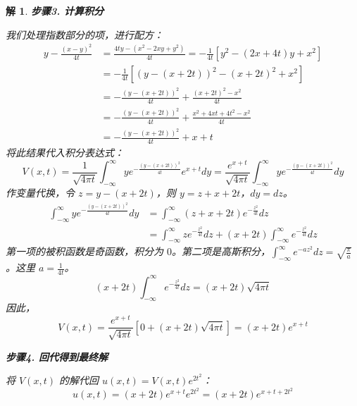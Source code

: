 \documentclass[12pt,a4paper]{article}
\newtheorem*{solution}{解}
\begin{document}
\begin{solution}
		\hrulefill
		
		\textbf{步骤3. 计算积分}
		
		\noindent
		我们处理指数部分的项，进行配方：
		\begin{align*}
			y - \frac{(x-y)^2}{4t} &= \frac{4ty - (x^2 - 2xy + y^2)}{4t} = -\frac{1}{4t} [y^2 - (2x+4t)y + x^2] \\[6pt]
			&= -\frac{1}{4t} \left[ \left(y - (x+2t)\right)^2 - (x+2t)^2 + x^2 \right] \\
			&= -\frac{(y - (x+2t))^2}{4t} + \frac{(x+2t)^2 - x^2}{4t} \\[6pt]
			&= -\frac{(y - (x+2t))^2}{4t} + \frac{x^2 + 4xt + 4t^2 - x^2}{4t} \\
			&= -\frac{(y - (x+2t))^2}{4t} + x + t
		\end{align*}
		将此结果代入积分表达式：
		\[
		V(x,t) = \frac{1}{\sqrt{4\pi t}} \int_{-\infty}^{\infty} y e^{-\frac{(y - (x+2t))^2}{4t}} e^{x+t} dy = \frac{e^{x+t}}{\sqrt{4\pi t}} \int_{-\infty}^{\infty} y e^{-\frac{(y - (x+2t))^2}{4t}} dy
		\]
		作变量代换，令 $z = y - (x+2t)$，则 $y = z + x + 2t$，$dy = dz$。
		\begin{align*}
			\int_{-\infty}^{\infty} y e^{-\frac{(y - (x+2t))^2}{4t}} dy &= \int_{-\infty}^{\infty} (z + x + 2t) e^{-\frac{z^2}{4t}} dz \\[6pt]
			&= \int_{-\infty}^{\infty} z e^{-\frac{z^2}{4t}} dz + (x+2t) \int_{-\infty}^{\infty} e^{-\frac{z^2}{4t}} dz
		\end{align*}
		第一项的被积函数是奇函数，积分为 $0$。第二项是高斯积分，$\int_{-\infty}^{\infty} e^{-az^2}dz = \sqrt{\frac{\pi}{a}}$。这里 $a = \frac{1}{4t}$。
		\[
		(x+2t) \int_{-\infty}^{\infty} e^{-\frac{z^2}{4t}} dz = (x+2t)\sqrt{4\pi t}
		\]
		因此，
		\[
		V(x,t) = \frac{e^{x+t}}{\sqrt{4\pi t}} \left[ 0 + (x+2t)\sqrt{4\pi t} \right] = (x+2t)e^{x+t}
		\]
		
		\hrulefill
		
		\textbf{步骤4. 回代得到最终解}
		
		\noindent
		将 $V(x,t)$ 的解代回 $u(x,t) = V(x,t) e^{2t^2}$：
		\[
		u(x,t) = (x+2t)e^{x+t} e^{2t^2} = (x+2t)e^{x+t+2t^2}
		\]
	\end{solution}
	
\end{document}
